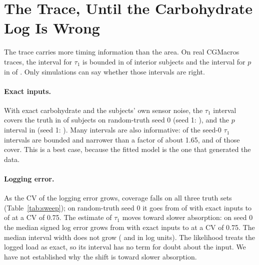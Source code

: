 \documentclass[letterpaper]{article} %
\begin{document}
\section{The Trace, Until the Carbohydrate Log Is Wrong}\label{sec:trace}

The trace carries more timing information than the area. On real CGMacros traces, the interval for $\tau_1$ is bounded in \wsRealTauBd{} of \wsRealTauInt{} interior subjects and the interval for $p$ in \wsRealPBd{} of \wsRealPInt{}. Only simulations can say whether those intervals are right.

\paragraph{Exact inputs.} With exact carbohydrate and the subjects' own sensor noise, the $\tau_1$ interval covers the truth in \wsRandAZeroCover{} of \wsN{} subjects on random-truth seed 0 (seed 1: \wsRandBZeroCover), and the $p$ interval in \wsRandAZeroCoverP{} (seed 1: \wsRandBZeroCoverP). Many intervals are also informative: \wsRandAZeroNarrow{} of the seed-0 $\tau_1$ intervals are bounded and narrower than a factor of about 1.65, and \wsRandAZeroNarrowCover{} of those cover. This is a best case, because the fitted model is the one that generated the data.

\paragraph{Logging error.} As the CV of the logging error grows, coverage falls on all three truth sets (Table~\ref{tab:sweep}); on random-truth seed 0 it goes from \wsRandAZeroCover{} of \wsN{} with exact inputs to \wsRandAThreeQuarterCover{} of \wsN{} at a CV of 0.75. The estimate of $\tau_1$ moves toward slower absorption: on seed 0 the median signed log error grows from \wsRandAZeroShift{} with exact inputs to \wsRandAThreeQuarterShift{} at a CV of 0.75. The median interval width does not grow (\wsRandAZeroWidth{} and \wsRandAThreeQuarterWidth{} in log units). The likelihood treats the logged load as exact, so its interval has no term for doubt about the input. We have not established why the shift is toward slower absorption.
\end{document}
